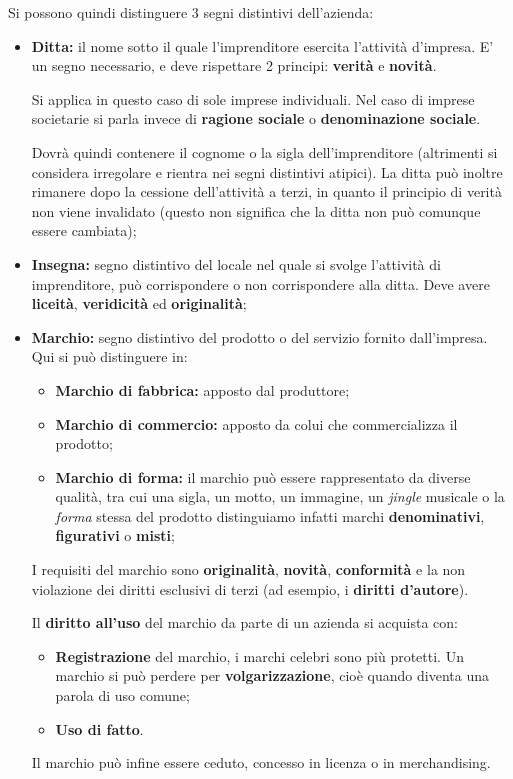 \documentclass[a4paper,11pt]{article}
\begin{document}
Si possono quindi distinguere 3 segni distintivi dell'azienda:
\begin{itemize}
	\item \textbf{Ditta:} il nome sotto il quale l'imprenditore esercita l'attività d'impresa.
		E' un segno necessario, e deve rispettare 2 principi: \textbf{verità} e \textbf{novità}. 
		
		Si applica in questo caso di sole imprese individuali.
		Nel caso di imprese societarie si parla invece di \textbf{ragione sociale} o \textbf{denominazione sociale}.

		Dovrà quindi contenere il cognome o la sigla dell'imprenditore (altrimenti si considera irregolare e rientra nei segni distintivi atipici).
		La ditta può inoltre rimanere dopo la cessione dell'attività a terzi, in quanto il principio di verità non viene invalidato (questo non significa che la ditta non può comunque essere cambiata);

	\item \textbf{Insegna:} segno distintivo del locale nel quale si svolge l'attività di imprenditore, può corrispondere o non corrispondere alla ditta. Deve avere \textbf{liceità}, \textbf{veridicità} ed \textbf{originalità};

	\item \textbf{Marchio:} segno distintivo del prodotto o del servizio fornito dall'impresa. Qui si può distinguere in:
		\begin{itemize}
			\item \textbf{Marchio di fabbrica:} apposto dal produttore;
			\item \textbf{Marchio di commercio:} apposto da colui che commercializza il prodotto;
			\item \textbf{Marchio di forma:} il marchio può essere rappresentato da diverse qualità, tra cui una sigla, un motto, un immagine, un \textit{jingle} musicale o la \textit{forma} stessa del prodotto distinguiamo infatti marchi \textbf{denominativi}, \textbf{figurativi} o \textbf{misti};
		\end{itemize}
		I requisiti del marchio sono \textbf{originalità}, \textbf{novità}, \textbf{conformità} e la non violazione dei diritti esclusivi di terzi (ad esempio, i \textbf{diritti d'autore}).

		Il \textbf{diritto all'uso} del marchio da parte di un azienda si acquista con:
		\begin{itemize}
			\item \textbf{Registrazione} del marchio, i marchi celebri sono più protetti. Un marchio si può perdere per \textbf{volgarizzazione}, cioè quando diventa una parola di uso comune;
			\item \textbf{Uso di fatto}. 
		\end{itemize}

		Il marchio può infine essere ceduto, concesso in licenza o in merchandising.
		
\end{itemize}
\end{document}
